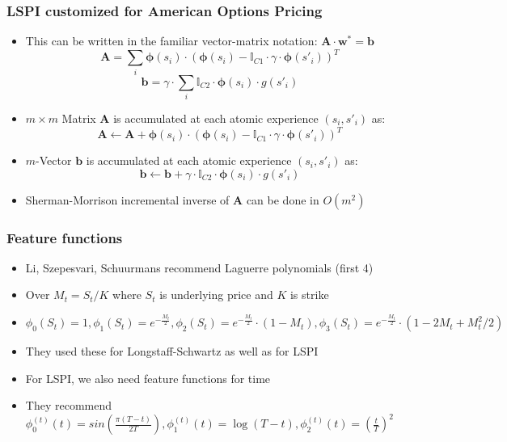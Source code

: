 \documentclass[handout]{beamer}
\begin{document}
\begin{frame}
\frametitle{LSPI customized for American Options Pricing}
\pause
\begin{itemize}[<+->]
\item This can be written in the familiar vector-matrix notation: $\bm{A} \cdot \bm{w}^* = \bm{b}$
$$\bm{A} = \sum_i \bm{\phi}(s_i) \cdot (\bm{\phi}(s_i) - \mathbb{I}_{C1} \cdot \gamma \cdot \bm{\phi}(s'_i))^T$$
$$\bm{b} = \gamma \cdot \sum_i \mathbb{I}_{C2} \cdot \bm{\phi}(s_i) \cdot  g(s'_i)$$
\item $m \times m$ Matrix $\bm{A}$ is accumulated at each atomic experience $(s_i,s'_i)$ as:
$$\bm{A} \leftarrow \bm{A} + \bm{\phi}(s_i) \cdot (\bm{\phi}(s_i) -  \mathbb{I}_{C1} \cdot \gamma \cdot \bm{\phi}(s'_i))^T$$
\item $m$-Vector $\bm{b}$ is accumulated at each atomic experience $(s_i, s'_i)$ as:
$$\bm{b} \leftarrow \bm{b} + \gamma  \cdot \mathbb{I}_{C2} \cdot \bm{\phi}(s_i) \cdot g(s'_i)$$
\item Sherman-Morrison incremental inverse of $\bm{A}$ can be done in $O(m^2)$
\end{itemize}
\end{frame}


\begin{frame}
\frametitle{Feature functions}
\pause
\begin{itemize}[<+->]
\item Li, Szepesvari, Schuurmans recommend Laguerre polynomials (first 4)
\item Over $M_t = S_t/K$ where $S_t$ is underlying price and $K$ is strike
\item $\phi_0(S_t) = 1, \phi_1(S_t) = e^{-\frac {M_t} 2}, \phi_2(S_t) = e^{-\frac{M_t} 2} \cdot (1-M_t), \phi_3(S_t) = e^{-\frac{M_t} 2} \cdot (1-2M_t+M_t^2/2)$
\item They used these for Longstaff-Schwartz as well as for LSPI
\item For LSPI, we also need feature functions for time
\item They recommend $\phi_0^{(t)}(t) = sin(\frac {\pi(T-t)} {2T}), \phi_1^{(t)}(t) = \log(T-t), \phi_2^{(t)}(t) = (\frac t T)^2$
\end{itemize}
\end{frame}
\end{document}
